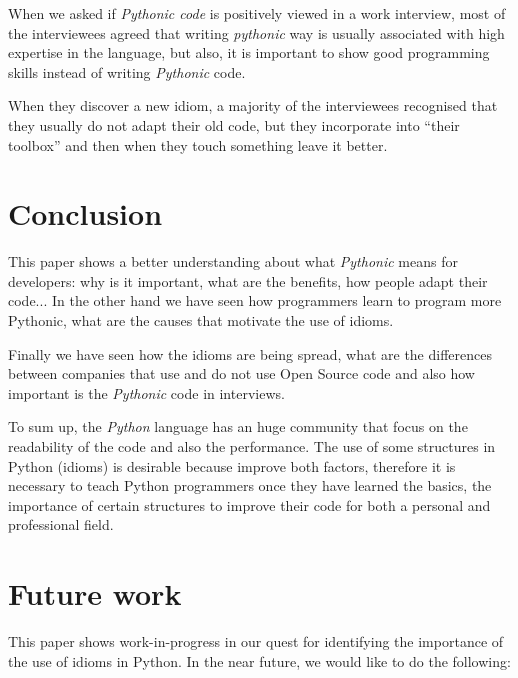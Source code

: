 \documentclass[a4paper]{article}
\begin{document}
When we asked if \textit{Pythonic code} is positively viewed in a work interview, most of the interviewees agreed that writing \textit{pythonic} way is usually associated with high expertise in the language, but also, it is important to show good programming skills instead of writing \textit{Pythonic} code.

When they discover a new idiom, a majority of the interviewees recognised that they usually do not adapt their old code, but they incorporate into  ``their toolbox'' and then when they touch something leave it better.


\section{Conclusion}

This paper shows a better understanding about what \textit{Pythonic} means for developers: why is it important, what are the benefits, how people adapt their code... In the other hand we have seen how programmers learn to program more Pythonic, what are the causes that motivate the use of idioms. 

Finally we have seen how the idioms are being spread, what are the differences between companies that use and do not use Open Source code and also how important is the \textit{Pythonic} code in interviews.

To sum up, the \textit{Python} language has an huge community that focus on the readability of the code and also the performance. The use of some structures in Python (idioms) is desirable because improve both factors, therefore it is necessary to teach Python programmers once they have learned the basics, the importance of certain structures to improve their code for both a personal and professional field.

\section{Future work}

This paper shows work-in-progress in our quest for identifying the importance of the use of idioms in Python. In the near future, we would like to do the following:
\end{document}
